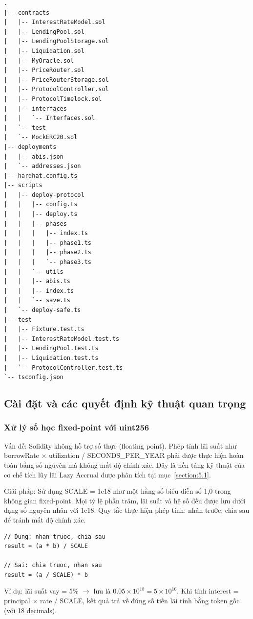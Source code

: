 \documentclass[../DoAn.tex]{subfiles}
\begin{document}
\begin{lstlisting}
.
|-- contracts
|   |-- InterestRateModel.sol
|   |-- LendingPool.sol
|   |-- LendingPoolStorage.sol
|   |-- Liquidation.sol
|   |-- MyOracle.sol
|   |-- PriceRouter.sol
|   |-- PriceRouterStorage.sol
|   |-- ProtocolController.sol
|   |-- ProtocolTimelock.sol
|   |-- interfaces
|   |   `-- Interfaces.sol
|   `-- test
|   `-- MockERC20.sol
|-- deployments
|   |-- abis.json
|   `-- addresses.json
|-- hardhat.config.ts
|-- scripts
|   |-- deploy-protocol
|   |   |-- config.ts
|   |   |-- deploy.ts
|   |   |-- phases
|   |   |   |-- index.ts
|   |   |   |-- phase1.ts
|   |   |   |-- phase2.ts
|   |   |   `-- phase3.ts
|   |   `-- utils
|   |   |-- abis.ts
|   |   |-- index.ts
|   |   `-- save.ts
|   `-- deploy-safe.ts
|-- test
|   |-- Fixture.test.ts
|   |-- InterestRateModel.test.ts
|   |-- LendingPool.test.ts
|   |-- Liquidation.test.ts
|   `-- ProtocolController.test.ts
`-- tsconfig.json
\end{lstlisting}

\subsection{Cài đặt và các quyết định kỹ thuật quan trọng}


\subsubsection{Xử lý số học fixed-point với uint256}
\label{section:6.1.3.a}


Vấn đề: Solidity không hỗ trợ số thực (floating point). Phép tính lãi suất như borrowRate $\times$ utilization / SECONDS\_PER\_YEAR phải được thực hiện hoàn toàn bằng số nguyên mà không mất độ chính xác. Đây là nền tảng kỹ thuật của cơ chế tích lũy lãi Lazy Accrual được phân tích tại mục~\ref{section:5.1}.

Giải pháp: Sử dụng SCALE = 1e18 như một hằng số biểu diễn số 1,0 trong không gian fixed-point. Mọi tỷ lệ phần trăm, lãi suất và hệ số đều được lưu dưới dạng số nguyên nhân với 1e18. Quy tắc thực hiện phép tính: nhân trước, chia sau để tránh mất độ chính xác.

\begin{lstlisting}
// Dung: nhan truoc, chia sau
result = (a * b) / SCALE

// Sai: chia truoc, nhan sau
result = (a / SCALE) * b
\end{lstlisting}


Ví dụ: lãi suất vay = 5\% $\rightarrow$ lưu là $0.05 \times 10^{18} = 5 \times 10^{16}$. Khi tính interest = principal $\times$ rate / SCALE, kết quả trả về đúng số tiền lãi tính bằng token gốc (với 18 decimals).
\end{document}
